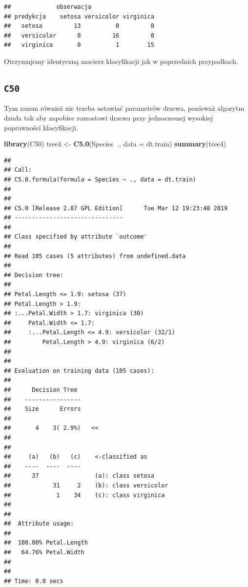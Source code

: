 \documentclass[]{book}
\newenvironment{Shaded}{\begin{snugshade}}{\end{snugshade}}
\newcommand{\DataTypeTok}[1]{\textcolor[rgb]{0.13,0.29,0.53}{#1}}
\newcommand{\KeywordTok}[1]{\textcolor[rgb]{0.13,0.29,0.53}{\textbf{#1}}}
\newcommand{\NormalTok}[1]{#1}
\newcommand{\OperatorTok}[1]{\textcolor[rgb]{0.81,0.36,0.00}{\textbf{#1}}}
\newcommand{\StringTok}[1]{\textcolor[rgb]{0.31,0.60,0.02}{#1}}
\theoremstyle{plain}
\theoremstyle{definition}
\begin{document}
\begin{verbatim}
##             obserwacja
## predykcja    setosa versicolor virginica
##   setosa         13          0         0
##   versicolor      0         16         0
##   virginica       0          1        15
\end{verbatim}

Otrzymujemy identyczną macierz klasyfikacji jak w poprzednich przypadkach.

\hypertarget{c50}{%
\subsection{\texorpdfstring{\texttt{C50}}{C50}}\label{c50}}

Tym razem również nie trzeba ustawiać parametrów drzewa, ponieważ algorytm działa tak aby zapobiec rozrostowi drzewa przy jednoczesnej wysokiej poprawności klasyfikacji.

\begin{Shaded}
\begin{Highlighting}[]
\KeywordTok{library}\NormalTok{(C50)}
\NormalTok{tree4 <-}\StringTok{ }\KeywordTok{C5.0}\NormalTok{(Species}\OperatorTok{~}\NormalTok{., }\DataTypeTok{data =}\NormalTok{ dt.train)}
\KeywordTok{summary}\NormalTok{(tree4)}
\end{Highlighting}
\end{Shaded}

\begin{verbatim}
## 
## Call:
## C5.0.formula(formula = Species ~ ., data = dt.train)
## 
## 
## C5.0 [Release 2.07 GPL Edition]      Tue Mar 12 19:23:48 2019
## -------------------------------
## 
## Class specified by attribute `outcome'
## 
## Read 105 cases (5 attributes) from undefined.data
## 
## Decision tree:
## 
## Petal.Length <= 1.9: setosa (37)
## Petal.Length > 1.9:
## :...Petal.Width > 1.7: virginica (30)
##     Petal.Width <= 1.7:
##     :...Petal.Length <= 4.9: versicolor (32/1)
##         Petal.Length > 4.9: virginica (6/2)
## 
## 
## Evaluation on training data (105 cases):
## 
##      Decision Tree   
##    ----------------  
##    Size      Errors  
## 
##       4    3( 2.9%)   <<
## 
## 
##     (a)   (b)   (c)    <-classified as
##    ----  ----  ----
##      37                (a): class setosa
##            31     2    (b): class versicolor
##             1    34    (c): class virginica
## 
## 
##  Attribute usage:
## 
##  100.00% Petal.Length
##   64.76% Petal.Width
## 
## 
## Time: 0.0 secs
\end{verbatim}
\end{document}

